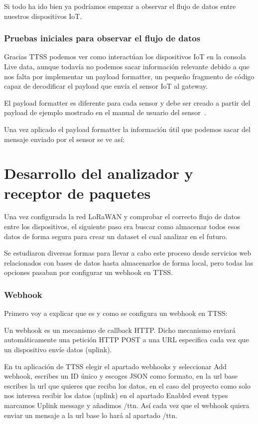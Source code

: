 Si todo ha ido bien ya podríamos empezar a observar el flujo de datos entre nuestros dispositivos IoT.

\subsubsection{Pruebas iniciales para observar el flujo de datos}
Gracias TTSS podemos ver como interactúan los dispositivos IoT en la consola Live data, aunque todavía no podemos sacar información relevante debido a que nos falta por implementar un payload formatter, un pequeño fragmento de código capaz de decodificar el payload que envía el sensor IoT al gateway.

El payload formatter es diferente para cada sensor y debe ser creado a partir del payload de ejemplo mostrado en el manual de usuario del sensor~\cite{MerryIoT:manual}.


Una vez aplicado el payload formatter la información útil que podemos sacar del mensaje enviado por el sensor se ve así:



\section{Desarrollo del analizador y receptor de paquetes }
Una vez configurada la red LoRaWAN y comprobar el correcto flujo de datos entre los dispositivos, el siguiente paso era buscar como almacenar todos esos datos de forma segura para crear un dataset el cual analizar en el futuro.

Se estudiaron diversas formas para llevar a cabo este proceso desde servicios web relacionados con bases de datos hasta almacenarlos de forma local, pero todas las opciones pasaban por configurar un webhook en TTSS.
\subsubsection{Webhook}

Primero voy a explicar que es y como se configura un webhook en TTSS:

Un webhook es un mecanismo de callback HTTP. Dicho mecanismo enviará automáticamente una petición HTTP POST a una URL especifica cada vez que un dispositivo envíe datos (uplink).

En tu aplicación de TTSS elegir el apartado webhooks y seleccionar Add webhook, escribes un ID único y escoges JSON como formato, en la url base escribes la url que quieres que reciba los datos, en el caso del proyecto como solo nos interesa recibir los datos (uplink) en el apartado Enabled event types marcamos Uplink message y añadimos /ttn. Así cada vez que el webhook quiera enviar un mensaje a la url base lo hará al apartado /ttn. 

